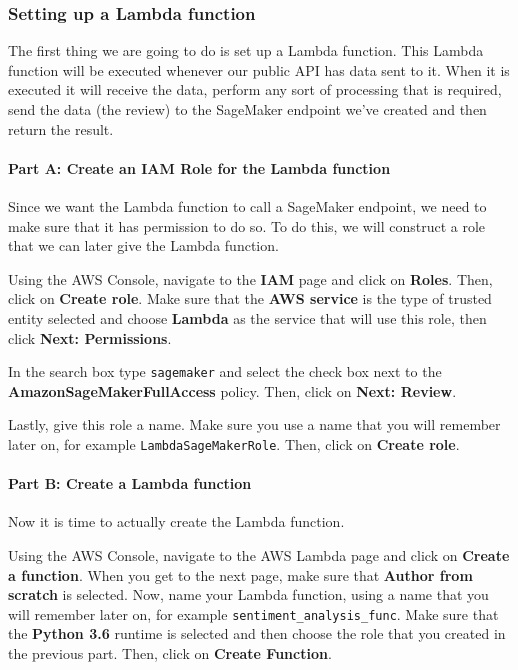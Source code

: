 \documentclass[11pt]{article}
\begin{document}
\hypertarget{setting-up-a-lambda-function}{%
\subsubsection{Setting up a Lambda
function}\label{setting-up-a-lambda-function}}

The first thing we are going to do is set up a Lambda function. This
Lambda function will be executed whenever our public API has data sent
to it. When it is executed it will receive the data, perform any sort of
processing that is required, send the data (the review) to the SageMaker
endpoint we've created and then return the result.

\hypertarget{part-a-create-an-iam-role-for-the-lambda-function}{%
\paragraph{Part A: Create an IAM Role for the Lambda
function}\label{part-a-create-an-iam-role-for-the-lambda-function}}

Since we want the Lambda function to call a SageMaker endpoint, we need
to make sure that it has permission to do so. To do this, we will
construct a role that we can later give the Lambda function.

Using the AWS Console, navigate to the \textbf{IAM} page and click on
\textbf{Roles}. Then, click on \textbf{Create role}. Make sure that the
\textbf{AWS service} is the type of trusted entity selected and choose
\textbf{Lambda} as the service that will use this role, then click
\textbf{Next: Permissions}.

In the search box type \texttt{sagemaker} and select the check box next
to the \textbf{AmazonSageMakerFullAccess} policy. Then, click on
\textbf{Next: Review}.

Lastly, give this role a name. Make sure you use a name that you will
remember later on, for example \texttt{LambdaSageMakerRole}. Then, click
on \textbf{Create role}.

\hypertarget{part-b-create-a-lambda-function}{%
\paragraph{Part B: Create a Lambda
function}\label{part-b-create-a-lambda-function}}

Now it is time to actually create the Lambda function.

Using the AWS Console, navigate to the AWS Lambda page and click on
\textbf{Create a function}. When you get to the next page, make sure
that \textbf{Author from scratch} is selected. Now, name your Lambda
function, using a name that you will remember later on, for example
\texttt{sentiment\_analysis\_func}. Make sure that the \textbf{Python
3.6} runtime is selected and then choose the role that you created in
the previous part. Then, click on \textbf{Create Function}.
\end{document}
